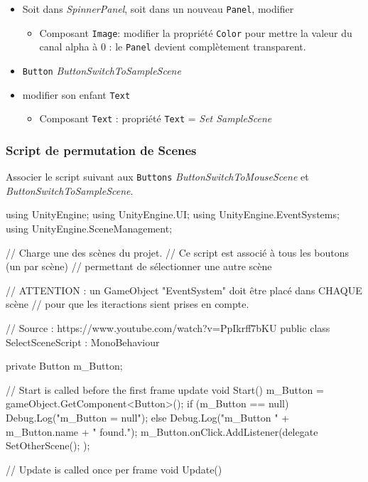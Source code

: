 \documentclass[a4paper,10pt]{article}
\newenvironment{solution}%
{\begin{tcolorbox}[breakable,colback=red!5!white,colframe=red!75!black,title=Solution]}%
{\end{tcolorbox}}
\newenvironment{boxcode}%
{\begin{tcolorbox}[breakable,colback=gray!5!white,colframe=black]}%
	{\end{tcolorbox}}
\begin{document}
\begin{solution}
\begin{itemize}
\begin{itemize}
		\item Soit dans \textit{SpinnerPanel}, soit dans un nouveau \texttt{Panel}, modifier
	\begin{itemize}
		\item 	Composant \texttt{Image}: modifier la propriété \texttt{Color} pour mettre la valeur du canal alpha à 0 : le \texttt{Panel} devient complètement transparent.
	\end{itemize}	
	\item \texttt{Button} \textit{ButtonSwitchToSampleScene}
	\item modifier son enfant \texttt{Text}
	\begin{itemize}
		\item Composant \texttt{Text} : propriété \texttt{Text} = \textit{Set SampleScene}
	\end{itemize}
\end{itemize}	
\end{itemize}

\subsubsection{Script de permutation de Scenes}

Associer le script suivant aux \texttt{Buttons}  \textit{ButtonSwitchToMouseScene} et \textit{ButtonSwitchToSampleScene}.


\begin{boxcode}
\begin{csharpsansbord}
using UnityEngine;
using UnityEngine.UI;
using UnityEngine.EventSystems;
using UnityEngine.SceneManagement;

// Charge une des scènes du projet.
// Ce script est associé à tous les boutons (un par scène)
// permettant de sélectionner une autre scène

// ATTENTION : un GameObject "EventSystem" doit être placé dans CHAQUE scène
// pour que les iteractions sient prises en compte.

// Source : https://www.youtube.com/watch?v=PpIkrff7bKU
public class SelectSceneScript : MonoBehaviour
{
	private Button m_Button;
	
	// Start is called before the first frame update
	void Start()
	{
		m_Button = gameObject.GetComponent<Button>();
		if (m_Button == null) {
			Debug.Log("m_Button = null");
		}
		else {
			Debug.Log("m_Button " + m_Button.name + " found.");
		}
		m_Button.onClick.AddListener(delegate {
			SetOtherScene();
		});
	}
	
	// Update is called once per frame
	void Update() {	}
	
}
\end{csharpsansbord}
\end{boxcode}
\end{solution}
\end{document}
